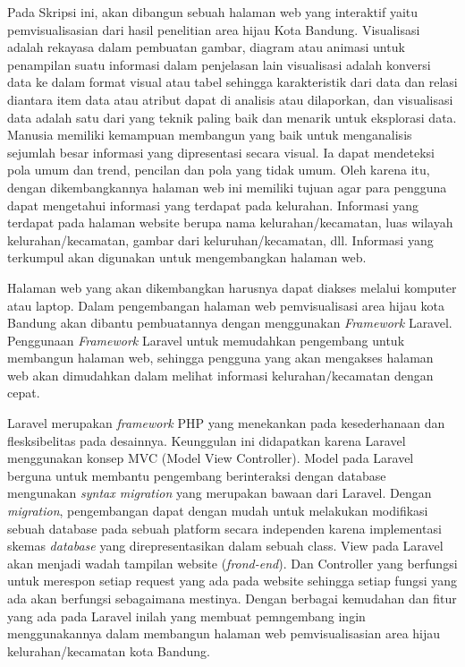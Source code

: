 Pada Skripsi ini, akan dibangun sebuah halaman web yang interaktif yaitu pemvisualisasian dari hasil penelitian area hijau Kota Bandung\cite{juan:22:pengumpulan}. Visualisasi adalah rekayasa dalam pembuatan gambar, diagram atau animasi untuk penampilan suatu informasi dalam penjelasan lain visualisasi adalah konversi data ke dalam format visual atau tabel sehingga karakteristik dari data dan relasi diantara item data atau atribut dapat di analisis atau dilaporkan, dan visualisasi data adalah satu dari yang teknik paling baik dan menarik untuk eksplorasi data. Manusia memiliki kemampuan membangun yang baik untuk menganalisis sejumlah besar informasi yang dipresentasi secara visual. Ia dapat mendeteksi pola umum dan trend, pencilan dan pola yang tidak umum. Oleh karena itu, dengan dikembangkannya halaman web ini memiliki tujuan agar para pengguna dapat mengetahui informasi yang terdapat pada kelurahan. Informasi yang terdapat pada halaman website berupa nama kelurahan/kecamatan, luas wilayah kelurahan/kecamatan, gambar dari keluruhan/kecamatan, dll. Informasi yang terkumpul akan digunakan untuk mengembangkan halaman web.


Halaman web yang akan dikembangkan harusnya dapat diakses melalui komputer atau laptop. Dalam pengembangan halaman web pemvisualisasi area hijau kota Bandung akan dibantu pembuatannya dengan menggunakan \emph{Framework} Laravel. Penggunaan \textit{Framework} Laravel untuk memudahkan pengembang untuk membangun halaman web, sehingga pengguna yang akan mengakses halaman web akan dimudahkan dalam melihat informasi kelurahan/kecamatan dengan cepat. 

Laravel merupakan \textit{framework} PHP yang menekankan pada kesederhanaan dan flesksibelitas pada desainnya. Keunggulan ini didapatkan karena Laravel menggunakan konsep MVC (Model View Controller). Model pada Laravel berguna untuk membantu pengembang berinteraksi dengan database mengunakan \textit{syntax migration} yang merupakan bawaan dari Laravel. Dengan \textit{migration}, pengembangan dapat dengan mudah untuk melakukan modifikasi sebuah database pada sebuah platform secara independen karena implementasi skemas \textit{database} yang direpresentasikan dalam sebuah class. View pada Laravel akan menjadi wadah tampilan website (\textit{frond-end}). Dan Controller yang berfungsi untuk merespon setiap request yang ada pada website sehingga setiap fungsi yang ada akan berfungsi sebagaimana mestinya. Dengan berbagai kemudahan dan fitur yang ada pada Laravel inilah yang membuat pemngembang ingin menggunakannya dalam membangun halaman web pemvisualisasian area hijau kelurahan/kecamatan kota Bandung.


